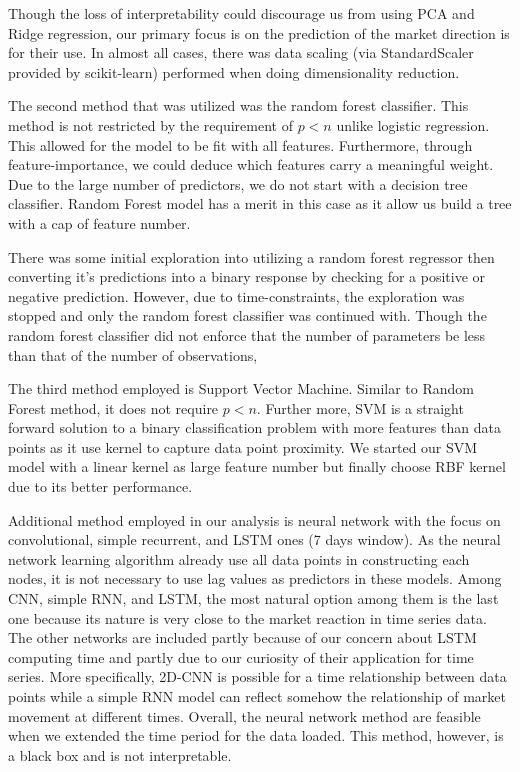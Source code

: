 \documentclass[11pt]{article}
\begin{document}
Though the loss of interpretability could discourage us from using PCA and Ridge regression, our primary focus is on the prediction of the market direction is for their use. In almost all cases, there was data scaling (via StandardScaler provided by scikit-learn) performed when doing dimensionality reduction.

The second method that was utilized was the random forest classifier. This method is not restricted by the requirement of $p<n$ unlike logistic regression. This allowed for the model to be fit with all features. Furthermore, through feature-importance, we could deduce which features carry a meaningful weight. Due to the large number of predictors, we do not start with a decision tree classifier. Random Forest model has a merit in this case as it allow us build a tree with a cap of feature number. 

There was some initial exploration into utilizing a random forest regressor then converting it's predictions into a binary response by checking for a positive or negative prediction. However, due to time-constraints, the exploration was stopped and only the random forest classifier was continued with. Though the random forest classifier did not enforce that the number of parameters be less than that of the number of observations, 

The third method employed is Support Vector Machine. Similar to Random Forest method, it does not require $p<n$. Further more, SVM is a straight forward solution to a binary classification problem with more features than data points as it use kernel to capture data point proximity. We started our SVM model with a linear kernel as large feature number but finally choose RBF kernel due to its better performance. 

Additional  method employed in our analysis is neural network with the focus on convolutional, simple recurrent, and LSTM ones (7 days window). As the neural network learning algorithm already use all data points in constructing each nodes, it is not necessary to use lag values as predictors in these models. Among CNN, simple RNN, and LSTM, the most natural option among them is the last one because its nature is very close to the market reaction in time series data. The other networks are included partly because of our concern about LSTM computing time and partly due to our curiosity of their application for time series. More specifically, 2D-CNN is possible for a time relationship between data points while a simple RNN model can reflect somehow the relationship of market movement at different times. Overall, the neural network method are feasible when we extended the time period for the data loaded. This method, however, is a black box and is not interpretable.   
\end{document}
